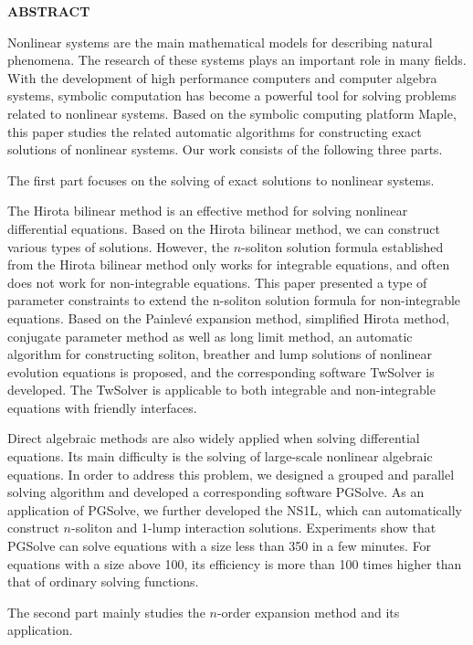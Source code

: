 {}
\centerline{\bfseries ABSTRACT}

\linespread{1.4}
\bigskip

Nonlinear systems are the main mathematical models for describing natural phenomena. The research of these systems plays an important role in many fields. With the development of high performance computers and computer algebra systems, symbolic computation has become a powerful tool for solving problems related to nonlinear systems. Based on the symbolic computing platform Maple, this paper studies the related automatic algorithms for constructing exact solutions of nonlinear systems. Our work consists of the following three parts.

The first part focuses on the solving of exact solutions to nonlinear systems.

The Hirota bilinear method is an effective method for solving nonlinear differential equations. Based on the Hirota bilinear method, we can construct various types of solutions. However, the $n$-soliton solution formula established from the Hirota bilinear method  only works for integrable equations, and often does not work for non-integrable equations. This paper presented a type of parameter constraints to extend the n-soliton solution formula for non-integrable equations. Based on the Painlevé expansion method, simplified Hirota method, conjugate parameter method as well as  long limit method, an automatic algorithm for constructing soliton, breather and lump solutions of nonlinear evolution equations is proposed, and the corresponding software TwSolver is developed. The TwSolver is applicable to both integrable and non-integrable equations with friendly interfaces. 

Direct algebraic methods are also widely applied when solving differential equations. Its main difficulty is the solving of large-scale nonlinear algebraic equations. In order to address this problem, we designed a grouped and parallel solving algorithm and developed a corresponding software PGSolve. As an application of PGSolve, we further developed the NS1L,  which can automatically construct $n$-soliton and 1-lump interaction solutions. Experiments show that PGSolve can solve equations with a size less than 350 in a few minutes. For equations with a size above 100, its efficiency is more than 100 times higher than that of ordinary solving functions.

The second part mainly studies the $n$-order expansion method and its application.

